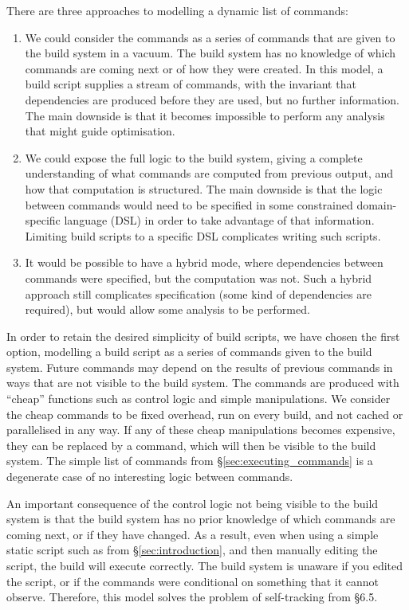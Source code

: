 There are three approaches to modelling a dynamic list of commands:

\begin{enumerate}
\item We could consider the commands as a series of commands that are given to the build system in a vacuum. The build system has no knowledge of which commands are coming next or of how they were created. In this model, a build script supplies a stream of commands, with the invariant that dependencies are produced before they are used, but no further information. The main downside is that it becomes impossible to perform any analysis that might guide optimisation.
\item We could expose the full logic to the build system, giving a complete understanding of what commands are computed from previous output, and how that computation is structured. The main downside is that the logic between commands would need to be specified in some constrained domain-specific language (DSL) in order to take advantage of that information. Limiting build scripts to a specific DSL complicates writing such scripts.
\item It would be possible to have a hybrid mode, where dependencies between commands were specified, but the computation was not. Such a hybrid approach still complicates specification (some kind of dependencies are required), but would allow some analysis to be performed.
\end{enumerate}

In order to retain the desired simplicity of build scripts, we have chosen the first option, modelling a build script as a series of commands given to the build system. Future commands may depend on the results of previous commands in ways that are not visible to the build system. The commands are produced with ``cheap'' functions such as control logic and simple manipulations. We consider the cheap commands to be fixed overhead, run on every build, and not cached or parallelised in any way. If any of these cheap manipulations becomes expensive, they can be replaced by a command, which will then be visible to the build system. The simple list of commands from \S\ref{sec:executing_commands} is a degenerate case of no interesting logic between commands.

An important consequence of the control logic not being visible to the build system is that the build system has no prior knowledge of which commands are coming next, or if they have changed. As a result, even when using a simple static script such as from \S\ref{sec:introduction}, and then manually editing the script, the build will execute correctly. The build system is unaware if you edited the script, or if the commands were conditional on something that it cannot observe. Therefore, this model solves the problem of self-tracking from \citet{build_systems_a_la_carte} \S6.5.

